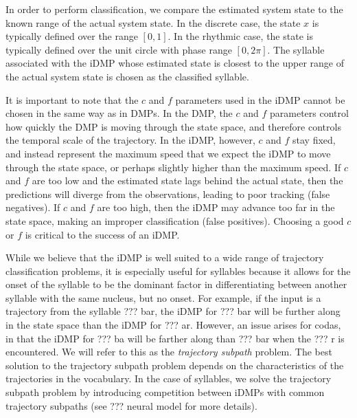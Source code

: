 In order to perform classification,
we compare the estimated system state
to the known range of the actual system state.
In the discrete case,
the state $x$ is typically defined
over the range $[0, 1]$.
In the rhythmic case,
the state is typically defined
over the unit circle
with phase range $[0, 2\pi]$.
The syllable associated with the iDMP
whose estimated state is closest
to the upper range of the actual system state
is chosen as the classified syllable.

It is important to note that
the $c$ and $f$ parameters
used in the iDMP cannot be chosen
in the same way as in DMPs.
In the DMP,
the $c$ and $f$ parameters
control how quickly
the DMP is moving through
the state space,
and therefore controls
the temporal scale
of the trajectory.
In the iDMP, however,
$c$ and $f$ stay fixed,
and instead represent
the maximum speed that
we expect the iDMP to
move through the state space,
or perhaps slightly higher than
the maximum speed.
If $c$ and $f$ are too low
and the estimated state
lags behind the actual state,
then the predictions will
diverge from the observations,
leading to poor tracking
(false negatives).
If $c$ and $f$ are too high,
then the iDMP may advance
too far in the state space,
making an improper classification
(false positives).
Choosing a good $c$ or $f$
is critical to the success of an iDMP.

While we believe that the iDMP
is well suited to a wide range
of trajectory classification problems,
it is especially useful for syllables
because it allows for
the onset of the syllable to
be the dominant factor
in differentiating between
another syllable with the same nucleus,
but no onset.
For example, if the input is a trajectory
from the syllable ??? bar,
the iDMP for ??? bar
will be further along in the state space
than the iDMP for ??? ar.
However, an issue arises
for codas,
in that the iDMP for ??? ba
will be farther along than
??? bar when the ??? r
is encountered.
We will refer to this as the
\textit{trajectory subpath} problem.
The best solution to the
trajectory subpath problem depends on
the characteristics of the trajectories
in the vocabulary.
In the case of syllables,
we solve the trajectory subpath problem
by introducing competition
between iDMPs with
common trajectory subpaths
(see ??? neural model for more details).


